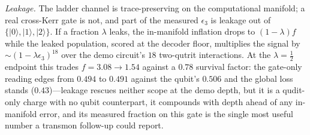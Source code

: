 \documentclass[aps,pra,reprint,superscriptaddress,nofootinbib,floatfix]{revtex4-2}
\begin{document}
\emph{Leakage.} The ladder channel is trace-preserving on the
computational manifold; a real cross-Kerr gate is not, and part of
the measured $\epsilon_3$ is leakage out of
$\{\lvert0\rangle,\lvert1\rangle,\lvert2\rangle\}$. If a fraction
$\lambda$ leaks, the in-manifold inflation drops to $(1-\lambda)f$
while the leaked population, scored at the decoder floor,
multiplies the signal by ${\sim}(1-\lambda\epsilon_3)^{18}$ over
the demo circuit's $18$ two-qutrit interactions. At the
$\lambda=\tfrac12$ endpoint this trades $f=3.08\to1.54$ against a
$0.78$ survival factor: the gate-only reading edges from $0.494$ to
$0.491$ against the qubit's $0.506$ and the global loss stands
($0.43$)---leakage rescues neither scope at the demo depth,
but it is a qudit-only charge with no qubit counterpart, it
compounds with depth ahead of any in-manifold error, and its
measured fraction on this gate is the single most useful number a
transmon follow-up could report.
\end{document}
